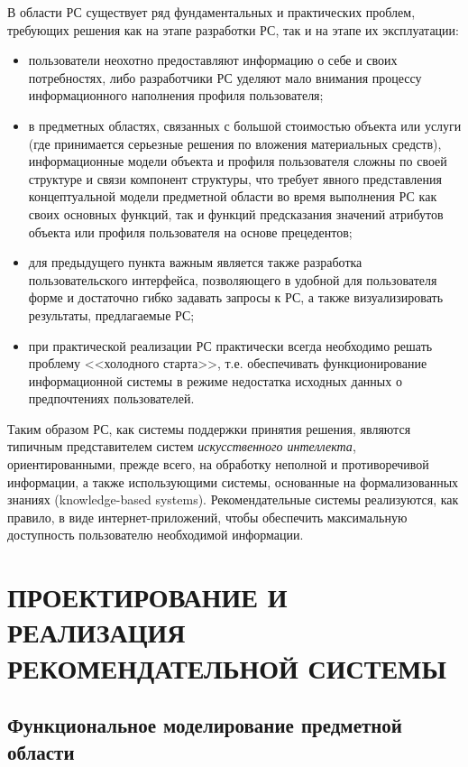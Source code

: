 \documentclass[a4paper,14pt,openany,final]{extreport} %
\begin{document}
В области РС существует ряд фундаментальных и практических проблем, требующих решения как на этапе разработки РС, так и на этапе их эксплуатации:
\begin{itemize}
\item пользователи неохотно предоставляют информацию о себе и
  своих потребностях, либо разработчики РС уделяют мало внимания
  процессу информационного наполнения профиля пользователя;
\item в предметных областях, связанных с большой стоимостью объекта или услуги (где принимается серьезные решения по вложения материальных средств), информационные модели объекта и профиля пользователя сложны по своей структуре и связи компонент структуры, что требует явного представления концептуальной модели предметной области во время выполнения РС как своих основных функций, так и функций предсказания значений атрибутов объекта или профиля пользователя на основе прецедентов;
\item для предыдущего пункта важным является также разработка пользовательского интерфейса, позволяющего в удобной для пользователя форме и достаточно гибко задавать запросы к РС, а также визуализировать результаты, предлагаемые РС;
\item при практической реализации РС практически всегда необходимо решать проблему <<холодного старта>>, т.е. обеспечивать функционирование информационной системы в режиме недостатка исходных данных о предпочтениях пользователей.
\end{itemize}

Таким образом РС, как системы поддержки принятия решения, являются типичным представителем систем \emph{искусственного интеллекта}, ориентированными, прежде всего, на обработку неполной и противоречивой информации, а также использующими системы, основанные на формализованных знаниях (\foreignlanguage{english}{knowledge-based systems}). Рекомендательные системы реализуются, как правило, в виде интернет-приложений, чтобы обеспечить максимальную доступность пользователю необходимой информации.

\chapter{ПРОЕКТИРОВАНИЕ И РЕАЛИЗАЦИЯ РЕКОМЕНДАТЕЛЬНОЙ СИСТЕМЫ}
\label{chap:dev-tech-theory}
\section{Функциональное моделирование предметной области}
\end{document}
